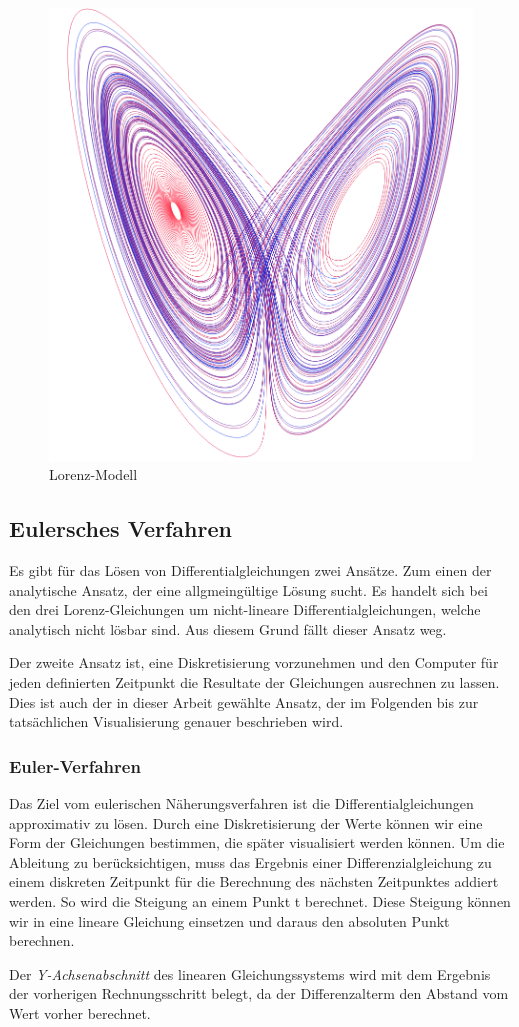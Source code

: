 \begin{figure}
	\centering
	\includegraphics[width=0.3\linewidth]{lorenz/assets/lorenz-modell/lorenz-modell}
	\caption{Lorenz-Modell}
	\label{fig:lorenz-modell}
\end{figure}


\subsection{Eulersches Verfahren}
Es gibt für das Lösen von Differentialgleichungen zwei Ansätze. Zum einen der analytische Ansatz, der eine allgmeingültige Lösung sucht. Es handelt sich bei den drei Lorenz-Gleichungen um nicht-lineare Differentialgleichungen, welche analytisch nicht lösbar sind. Aus diesem Grund fällt dieser Ansatz weg. 

Der zweite Ansatz ist, eine Diskretisierung vorzunehmen und den Computer für jeden definierten Zeitpunkt die Resultate der Gleichungen ausrechnen zu lassen. Dies ist auch der in dieser Arbeit gewählte Ansatz, der im Folgenden bis zur tatsächlichen Visualisierung genauer beschrieben wird. 

\subsubsection{Euler-Verfahren}

Das Ziel vom eulerischen Näherungsverfahren ist die Differentialgleichungen approximativ zu lösen. Durch eine Diskretisierung der Werte können wir eine Form der Gleichungen bestimmen, die später visualisiert werden können. Um die Ableitung zu berücksichtigen, muss das Ergebnis einer Differenzialgleichung zu einem diskreten Zeitpunkt für die Berechnung des nächsten Zeitpunktes addiert werden. So wird die Steigung an einem Punkt t berechnet. Diese Steigung können wir in eine lineare Gleichung einsetzen und daraus den absoluten Punkt berechnen.

Der \textit{Y-Achsenabschnitt} des linearen Gleichungssystems wird mit dem Ergebnis der vorherigen Rechnungsschritt belegt, da der Differenzalterm den Abstand vom Wert vorher berechnet.

